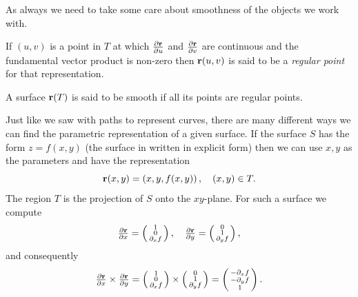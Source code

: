 As always we need to take some care about smoothness of the objects we work with.
\begin{definition*}
    If \((u,v)\) is a point in \(T\) at which \(\frac{\partial \mathbf{r}}{\partial u}\) and \(\frac{\partial \mathbf{r}}{\partial v}\) are continuous and the fundamental vector product is non-zero then \(\mathbf{r}(u,v)\) is said to be a \emph{regular point} for that representation.
\end{definition*}

\begin{definition*}
    A surface \(\mathbf{r}(T)\) is said to be smooth if all its points are regular points.
\end{definition*}

Just like we saw with paths to represent curves, there are many different ways we can find the parametric representation of a given surface.
If the surface \(S\) has the form \(z = f(x,y)\) (the surface in written in explicit form) then we can use \(x,y\) as the parameters and have the representation
\[
    \mathbf{r}(x,y)= \left(x,y,f(x,y)\right), \quad (x,y) \in T.
\]
The region \(T\) is the projection of \(S\) onto the \(xy\)-plane.
For such a surface we compute
\[
    \tfrac{\partial \mathbf{r}}{\partial x} = \left(\begin{smallmatrix}
            {1} \\ 0 \\ \partial_{x} f
        \end{smallmatrix}\right),
    \quad
    \tfrac{\partial \mathbf{r}}{\partial y} = \left(\begin{smallmatrix}
            {0} \\ {1} \\ {\partial_{y} f}
        \end{smallmatrix}\right),
\]
and consequently
\[
    \tfrac{\partial \mathbf{r}}{\partial x} \times \tfrac{\partial \mathbf{r}}{\partial y}
    = \left(\begin{smallmatrix}
            1 \\ 0 \\ \partial_{x} f
        \end{smallmatrix}\right)
    \times
    \left(\begin{smallmatrix}
            {0} \\ {1} \\ {\partial_{y} f}
        \end{smallmatrix}\right)
    =
    \left(\begin{smallmatrix}
            {-\partial_{x} f} \\ {-\partial_{y} f} \\ {1}
        \end{smallmatrix}\right).
\]

